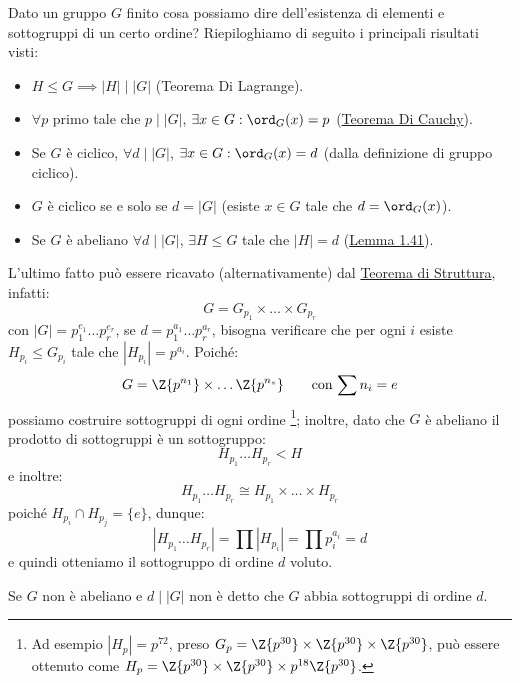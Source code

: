 \documentclass[11pt]{scrartcl}
\begin{document}
\begin{remark}
    Dato un gruppo $G$ finito cosa possiamo dire dell'esistenza di elementi e sottogruppi di un certo ordine? Riepiloghiamo di seguito i principali risultati visti:
        \begin{itemize}
            \item $H \leqslant G \implies |H| \mid |G|$ (Teorema Di Lagrange).
            \item $\forall p$ primo tale che $p \mid |G|$, $\exists x \in G : \ord_G(x) = p$ (\hyperref[p:Cauchy]{Teorema Di Cauchy}).
            \item Se $G$ è ciclico, $\forall d \mid |G|$, $\exists x \in G : \ord_G(x) = d$ (dalla definizione di gruppo ciclico).
            \item $G$ è ciclico se e solo se $d = |G|$ (esiste $x \in G$ tale che $d = \ord_G(x)$).
            \item Se $G$ è abeliano $\forall d \mid |G|$, $\exists H \leqslant G$ tale che $|H| = d$ (\hyperref[davide]{Lemma 1.41}).
        \end{itemize}
\end{remark}
L'ultimo fatto può essere ricavato (alternativamente) dal \hyperref[t:struttura]{Teorema di Struttura}, infatti:
    \[ G = G_{p_1} \times \ldots \times G_{p_r}
        \]
con $|G| = p_1^{e_1}\ldots p_r^{e_r}$, se $d = p_1^{a_1}\ldots p_r^{a_r}$, bisogna verificare che per ogni $i$ esiste $H_{p_i} \leqslant G_{p_i}$ tale che $|H_{p_i}| = p^{a_i}$.
Poiché:
    \[ G = \Z{p^{n_1}} \times \ldots \Z{p^{n_s}} \qquad \text{con $\sum n_i = e$}
        \]
possiamo costruire sottogruppi di ogni ordine \footnote{Ad esempio $|H_p| = p^{72}$, preso $G_p = \Z{p^{30}} \times \Z{p^{30}} \times \Z{p^{30}}$, può essere ottenuto come $H_p = \Z{p^{30}} \times \Z{p^{30}} \times p^{18} \Z{p^{30}}$.};
inoltre, dato che $G$ è abeliano il prodotto di sottogruppi è un sottogruppo:
    \[ H_{p_1}\ldots H_{p_r} < H
        \]
e inoltre:
    \[ H_{p_1}\ldots H_{p_r} \cong H_{p_1} \times \ldots \times H_{p_r}
        \]
poiché $H_{p_i} \cap H_{p_j} = \{e\}$, dunque:
    \[ |H_{p_1}\ldots H_{p_r}| = \prod |H_{p_i}| = \prod p_{i}^{a_i} = d
        \]
e quindi otteniamo il sottogruppo di ordine $d$ voluto.
    
\begin{remark}
    Se $G$ non è abeliano e $d \mid |G|$ non è detto che $G$ abbia sottogruppi di ordine $d$.
\end{remark}
\end{document}
